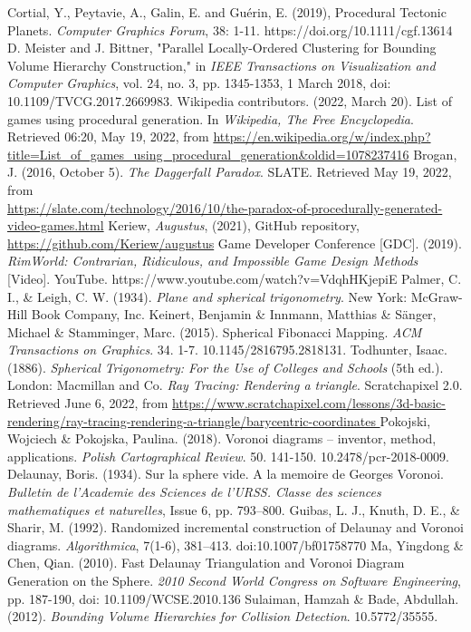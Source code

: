 \begin{thebibliography}{9}
Cortial, Y., Peytavie, A., Galin, E. and Guérin, E. (2019), Procedural Tectonic Planets. \textit{Computer Graphics Forum}, 38: 1-11. https://doi.org/10.1111/cgf.13614
D. Meister and J. Bittner, "Parallel Locally-Ordered Clustering for Bounding Volume Hierarchy Construction," in \textit{IEEE Transactions on Visualization and Computer Graphics}, vol. 24, no. 3, pp. 1345-1353, 1 March 2018, doi: 10.1109/TVCG.2017.2669983.
Wikipedia contributors. (2022, March 20). List of games using procedural generation. In \textit{Wikipedia, The Free Encyclopedia}. Retrieved 06:20, May 19, 2022, from \url{https://en.wikipedia.org/w/index.php?title=List\_of\_games\_using\_procedural\_generation\&oldid=1078237416}
Brogan, J. (2016, October 5). \textit{The Daggerfall Paradox}. SLATE. Retrieved May 19, 2022, from\\ \url{https://slate.com/technology/2016/10/the-paradox-of-procedurally-generated-video-games.html}
Keriew, \textit{Augustus}, (2021), GitHub repository, \url{https://github.com/Keriew/augustus}
Game Developer Conference [GDC]. (2019). \textit{RimWorld: Contrarian, Ridiculous, and Impossible Game Design Methods} [Video]. YouTube. https://www.youtube.com/watch?v=VdqhHKjepiE
Palmer, C. I., \& Leigh, C. W. (1934). \textit{Plane and spherical trigonometry}. New York: McGraw-Hill Book Company, Inc. 
Keinert, Benjamin  \& Innmann, Matthias \& Sänger, Michael \& Stamminger, Marc. (2015). Spherical Fibonacci Mapping. \textit{ACM Transactions on Graphics}. 34. 1-7. 10.1145/2816795.2818131. 
Todhunter, Isaac. (1886). \textit{Spherical Trigonometry: For the Use of Colleges and Schools} (5th ed.). London: Macmillan and Co.
\textit{Ray Tracing: Rendering a triangle}. Scratchapixel 2.0. Retrieved June 6, 2022, from \url{https://www.scratchapixel.com/lessons/3d-basic-rendering/ray-tracing-rendering-a-triangle/barycentric-coordinates }
Pokojski, Wojciech \& Pokojska, Paulina. (2018). Voronoi diagrams – inventor, method, applications. \textit{Polish Cartographical Review}. 50. 141-150. 10.2478/pcr-2018-0009. 
 Delaunay, Boris. (1934). Sur la sphere vide. A la memoire de Georges Voronoi. \textit{Bulletin de l’Academie des Sciences de l’URSS. Classe des sciences mathematiques et naturelles}, Issue 6, pp. 793–800.
 Guibas, L. J., Knuth, D. E., \& Sharir, M. (1992). Randomized incremental construction of Delaunay and Voronoi diagrams. \textit{Algorithmica}, 7(1-6), 381–413. doi:10.1007/bf01758770 
Ma,  Yingdong \& Chen, Qian. (2010). Fast Delaunay Triangulation and Voronoi Diagram Generation on the Sphere. \textit{2010 Second World Congress on Software Engineering},  pp. 187-190, doi: 10.1109/WCSE.2010.136
Sulaiman, Hamzah \& Bade, Abdullah. (2012). \textit{Bounding Volume Hierarchies for Collision Detection}. 10.5772/35555. 
\end{thebibliography}